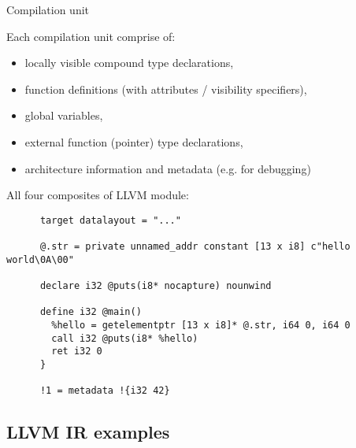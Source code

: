 \documentclass[8pt]{beamer}
\begin{document}
\begin{frame}[fragile]{Compilation unit}
  \begin{block}{Each compilation unit comprise of:}
    \begin{itemize}
      \item locally visible compound type declarations,
      \item function definitions (with attributes / visibility specifiers),
      \item global variables,
      \item external function (pointer) type declarations,
      \item architecture information and metadata (e.g. for debugging)
    \end{itemize}
  \end{block}

  \begin{exampleblock}{All four composites of LLVM module:}
    \begin{verbatim}
      target datalayout = "..."

      @.str = private unnamed_addr constant [13 x i8] c"hello world\0A\00"

      declare i32 @puts(i8* nocapture) nounwind

      define i32 @main() 
        %hello = getelementptr [13 x i8]* @.str, i64 0, i64 0
        call i32 @puts(i8* %hello)
        ret i32 0
      }

      !1 = metadata !{i32 42}
    \end{verbatim}
  \end{exampleblock}
\end{frame}

\subsection*{LLVM IR examples}
\end{document}
